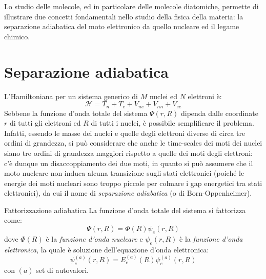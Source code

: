 
Lo studio delle molecole, ed in particolare delle molecole diatomiche, permette di illustrare due concetti fondamentali nello studio della fisica della materia: la separazione adiabatica del moto elettronico da quello nucleare ed il legame chimico.

\section{Separazione adiabatica}

L'Hamiltoniana per un sistema generico di $ M $ nuclei ed $ N $ elettroni è:
\begin{equation}
	\mathcal{H} = T_n + T_e + V_{ne} + V_{nn} + V_{ee}
	\label{eq:mol-ham-tot}
\end{equation}
Sebbene la funzione d'onda totale del sistema $ \Psi(r,R) $ dipenda dalle coordinate $ r $ di tutti gli elettroni ed $ R $ di tutti i nuclei, è possibile semplificare il problema. Infatti, essendo le masse dei nuclei e quelle degli elettroni diverse di circa tre ordini di grandezza, si può considerare che anche le time-scales dei moti dei nuclei siano tre ordini di grandezza maggiori rispetto a quelle dei moti degli elettroni: c'è dunque un disaccoppiamento dei due moti\footnotemark, in quanto si può assumere che il moto nucleare non induca alcuna transizione sugli stati elettronici (poiché le energie dei moti nucleari sono troppo piccole per colmare i gap energetici tra stati elettronici), da cui il nome di \textit{separazione adiabatica} (o di Born-Oppenheimer).


\begin{definition}{Fattorizzazione adiabatica}{}
	La funzione d'onda totale del sistema si fattorizza come:
	\begin{equation}
		\Psi(r,R) = \Phi(R) \psi_e(r,R)
	\end{equation}
	dove $ \Phi(R) $ è la \textit{funzione d'onda nucleare} e $ \psi_e(r,R) $ è la \textit{funzione d'onda elettronica}, la quale è soluzione dell'equazione d'onda elettronica:
	\begin{equation}
		[T_e + V_{ne}(r,R) + V_{ee}(r)] \psi_e^{(a)}(r,R) = E_e^{(a)}(R) \psi_e^{(a)}(r,R)
		\label{eq:mol-elc-eq}
	\end{equation}
	con $ (a) $ set di autovalori.
\end{definition}

